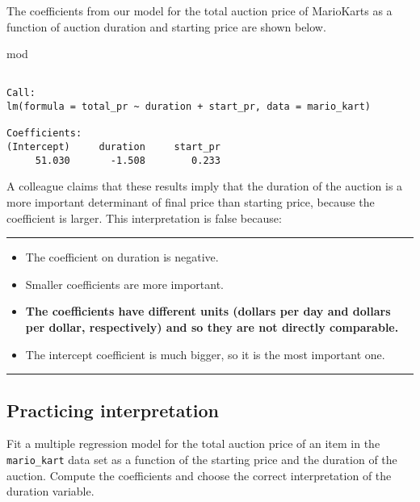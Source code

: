 \documentclass[
]{book}
\newenvironment{Shaded}{\begin{snugshade}}{\end{snugshade}}
\newcommand{\NormalTok}[1]{#1}
\begin{document}
The coefficients from our model for the total auction price of MarioKarts as a function of auction duration and starting price are shown below.

\begin{Shaded}
\begin{Highlighting}[]
\NormalTok{mod}
\end{Highlighting}
\end{Shaded}

\begin{verbatim}

Call:
lm(formula = total_pr ~ duration + start_pr, data = mario_kart)

Coefficients:
(Intercept)     duration     start_pr  
     51.030       -1.508        0.233  
\end{verbatim}

A colleague claims that these results imply that the duration of the auction is a more important determinant of final price than starting price, because the coefficient is larger. This interpretation is false because:

\begin{center}\rule{0.5\linewidth}{0.5pt}\end{center}

\begin{itemize}
\item
  The coefficient on duration is negative.
\item
  Smaller coefficients are more important.
\item
  \textbf{The coefficients have different units (dollars per day and dollars per dollar, respectively) and so they are not directly comparable.}
\item
  The intercept coefficient is much bigger, so it is the most important one.
\end{itemize}

\begin{center}\rule{0.5\linewidth}{0.5pt}\end{center}

\hypertarget{practicing-interpretation}{%
\subsection*{Practicing interpretation}\label{practicing-interpretation}}

Fit a multiple regression model for the total auction price of an item in the \texttt{mario\_kart} data set as a function of the starting price and the duration of the auction. Compute the coefficients and choose the correct interpretation of the duration variable.
\end{document}
